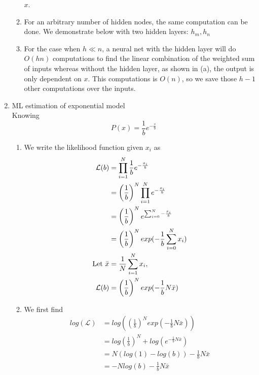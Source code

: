 \documentclass{article}
\begin{document}
\begin{enumerate}
\begin{enumerate}
                \(x\).
            \item %
                For an arbitrary number of hidden nodes, the same
                computation can be done. We demonstrate below with two
                hidden layers: \(h_m, h_n\)
            \item %
                For the case when \(h \ll n\), a neural net with the hidden
                layer will do \(O(hn)\) computations to find the linear
                combination of the weighted sum of inputs whereas without
                the hidden layer, as shown in (a), the output is only
                dependent on \(x\). This computations is \(O(n)\), so we 
                save those \(h-1\) other computations over the inputs.
        \end{enumerate}
    \item ML estimation of exponential model \\ %
        Knowing
        \begin{equation*}
            P(x) = \frac{1}{b}e^{-\frac{x}{b}}
        \end{equation*}
        \begin{enumerate}
            \item %
                We write the likelihood function given \(x_i\) as
                \begin{align*}
                \mathcal{L}(b) 
                &= \prod_{i = 1}^N \frac{1}{b}e^{-\frac{x_i}{b}}\\
                &= \left(\frac{1}{b}\right)^N \prod_{i=1}^N e^{-\frac{x_i}{b}}\\
                &= \left(\frac{1}{b}\right)^N e^{\sum_{i=0}^N -\frac{x_i}{b}}\\
                &= \left(\frac{1}{b}\right)^N exp(-\frac{1}{b}\sum_{i=0}^N x_i)\\
                \textnormal{Let } \bar{x} &= \frac{1}{N}\sum_{i=1}^Nx_i,\\
                \mathcal{L}(b) &= \left(\frac{1}{b}\right)^N exp(-\frac{1}{b}N\bar{x})
                \end{align*}

            \item %
                We first find
                \begin{align*}
                log(\mathcal{L}) 
                    &= log\left(\left(\frac{1}{b}\right)^N exp(-\frac{1}{b}N\bar{x})\right)\\
                    &= log\left(\frac{1}{b}\right)^N + 
                        log\left(e^{-\frac{1}{b}N\bar{x}}\right)\\
                    &= N(log(1) - log(b)) -\frac{1}{b}N\bar{x}\\
                    &= -Nlog(b) - \frac{1}{b}N\bar{x}
                \end{align*}


\end{enumerate}
\end{enumerate}
\end{document}
